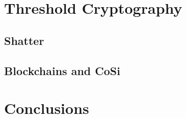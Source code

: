 \section{Threshold Cryptography}

\subsection{Shatter}

\subsection{Blockchains and CoSi}

\section{Conclusions}
